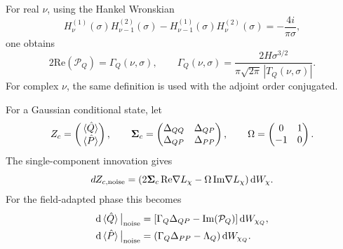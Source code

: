 \documentclass{article}
\numberwithin{equation}{section}
\begin{document}
	For real \(\nu\), using the Hankel Wronskian
	\begin{equation}
		H_\nu^{(1)}(\sigma)H_{\nu-1}^{(2)}(\sigma) - H_{\nu-1}^{(1)}(\sigma)H_\nu^{(2)}(\sigma) = -\frac{4i}{\pi\sigma},
	\end{equation}
	one obtains
	\begin{equation}
		2\mathrm{Re}(\mathcal P_Q) = \Gamma_Q(\nu,\sigma), \qquad \Gamma_Q(\nu,\sigma) = \frac{2H\sigma^{3/2}} {\pi\sqrt{2\pi}\,|T_Q(\nu,\sigma)|}.
		\label{eq:GammaQNoAlphaBetaApp}
	\end{equation}
	For complex \(\nu\), the same definition is used with the adjoint order conjugated.

	For a Gaussian conditional state, let
	\begin{equation}
		Z_c=
		\begin{pmatrix}
			\ev*{\hat Q}\\ \ev*{\hat P}
		\end{pmatrix},
		\qquad \mathbf{\Sigma}_c=
		\begin{pmatrix}
			\Delta_{QQ} & \Delta_{QP}\\ \Delta_{QP} & \Delta_{PP}
		\end{pmatrix},
		\qquad \Omega=
		\begin{pmatrix}
			0&1\\ -1&0
		\end{pmatrix}.
	\end{equation}
	The single-component innovation gives
	\begin{equation}
		dZ_{c,{\rm noise}} = \left( 2\mathbf{\Sigma}_c\,\mathrm{Re}\nabla L_\chi - \Omega\,\mathrm{Im}\nabla L_\chi \right)\dd W_\chi .
	\end{equation}
	For the field-adapted phase this becomes
	\begin{align}
		\dd\ev*{\hat Q}\big|_{\rm noise} &= \left[ \Gamma_Q\Delta_{QP} - \mathrm{Im}(\mathcal P_Q) \right]\dd W_{\chi_Q}, \\ \dd\ev*{\hat P}\big|_{\rm noise} &= \left( \Gamma_Q\Delta_{PP} - \Lambda_Q \right)\dd W_{\chi_Q}.
	\end{align}
\end{document}
